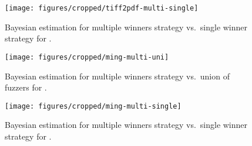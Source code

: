 \begin{figure}[h]
    \centering%
    \texttt{[image: figures/cropped/tiff2pdf-multi-single]}
    \caption{Bayesian estimation for multiple winners strategy vs.\ single
    winner strategy for \tiffpdf.}
    \label{fig:best-tiff2pdf-multi-single}
\end{figure}


\begin{figure}[h]
    \centering%
    \texttt{[image: figures/cropped/ming-multi-uni]}
    \caption{Bayesian estimation for multiple winners strategy vs.\ union of
    fuzzers for \listswf.}
    \label{fig:best-ming-multi-union}
\end{figure}

\begin{figure}[h]
    \centering%
    \texttt{[image: figures/cropped/ming-multi-single]}
    \caption{Bayesian estimation for multiple winners strategy vs.\ single
    winner strategy for \listswf.}
    \label{fig:best-ming-multi-single}
\end{figure}

